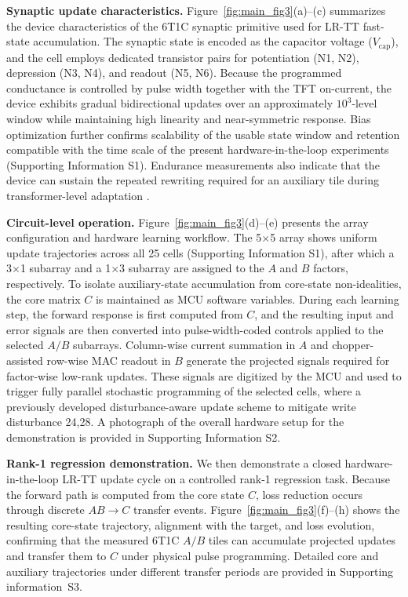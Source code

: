\documentclass[AMA,LATO2COL]{WileyNJDv5}
\begin{document}
\noindent\textbf{Synaptic update characteristics.}
Figure~\ref{fig:main_fig3}(a)--(c) summarizes the device characteristics of the 6T1C synaptic primitive used for LR-TT fast-state accumulation. The synaptic state is encoded as the capacitor voltage ($V_{\mathrm{cap}}$), and the cell employs dedicated transistor pairs for potentiation (N1, N2), depression (N3, N4), and readout (N5, N6). Because the programmed conductance is controlled by pulse width together with the TFT on-current, the device exhibits gradual bidirectional updates over an approximately $10^{3}$-level window while maintaining high linearity and near-symmetric response. Bias optimization further confirms scalability of the usable state window and retention compatible with the time scale of the present hardware-in-the-loop experiments (Supporting Information S1). Endurance measurements also indicate that the device can sustain the repeated rewriting required for an auxiliary tile during transformer-level adaptation \cite{ambrogio2018analogtraining,li2018insitu,legallo2018mixedprecision,mackin2022weightprogramming,won2023advs_6t1c,kang2025advs_disturbance}.

\noindent\textbf{Circuit-level operation.}
Figure~\ref{fig:main_fig3}(d)--(e) presents the array configuration and hardware learning workflow. The 5$\times$5 array shows uniform update trajectories across all 25 cells (Supporting Information S1), after which a 3$\times$1 subarray and a 1$\times$3 subarray are assigned to the $A$ and $B$ factors, respectively. To isolate auxiliary-state accumulation from core-state non-idealities, the core matrix $C$ is maintained as MCU software variables. During each learning step, the forward response is first computed from $C$, and the resulting input and error signals are then converted into pulse-width-coded controls applied to the selected $A/B$ subarrays. Column-wise current summation in $A$ and chopper-assisted row-wise MAC readout in $B$ generate the projected signals required for factor-wise low-rank updates. These signals are digitized by the MCU and used to trigger fully parallel stochastic programming of the selected cells, where a previously developed disturbance-aware update scheme to mitigate write disturbance 24,28. A photograph of the overall hardware setup for the demonstration is provided in Supporting Information S2.

\noindent\textbf{Rank-1 regression demonstration.}
We then demonstrate a closed hardware-in-the-loop LR-TT update cycle on a controlled rank-1 regression task.
Because the forward path is computed from the core state \(C\), loss reduction occurs through discrete \(AB\!\rightarrow C\) transfer events.
Figure~\ref{fig:main_fig3}(f)--(h) shows the resulting core-state trajectory, alignment with the target, and loss evolution, confirming that the measured 6T1C \(A/B\) tiles can accumulate projected updates and transfer them to \(C\) under physical pulse programming.
Detailed core and auxiliary trajectories under different transfer periods are provided in Supporting information~S3.
\end{document}
